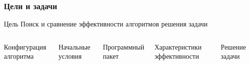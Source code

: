 \documentclass[presentation,18pt]{beamer}
\begin{document}
\begin{frame}[t]
	\label{goals}
	\frametitle{Цели и задачи}

	\begin{block}{Цель}
		Поиск и сравнение эффективности алгоритмов решения задачи
	\end{block}

	\begin{columns}

		\begin{block}{Конфигурация алгоритма}
		\end{block}

		\begin{alertblock}{Начальные условия}
			\vspace{80pt}
		\end{alertblock}


		\begin{block}{Программный пакет}
			\vspace{80pt}
		\end{block}


		\begin{block}{Характеристики эффективности}
		\end{block}

		\begin{alertblock}{Решение задачи}
			\vspace{80pt}
		\end{alertblock}

	\end{columns}
\end{frame}
\end{document}
